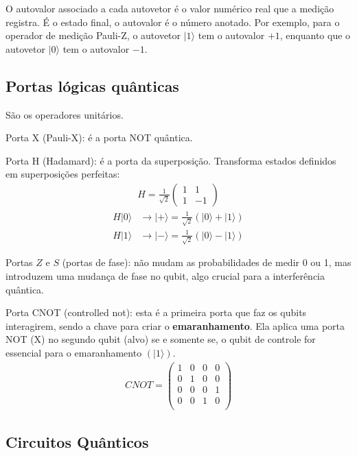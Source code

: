 \documentclass[12pt, a4paper]{article}
\newcommand{\ket}[1]{\lvert #1 \rangle}
\begin{document}
O autovalor associado a cada autovetor é o valor numérico real que a medição registra. É o estado final, o autovalor é o número anotado. Por exemplo, para o operador de medição Pauli-Z, o autovetor $\ket{1}$ tem o autovalor $+1$, enquanto que o autovetor $\ket{0}$ tem o autovalor $-1$. 

\subsection{Portas lógicas quânticas}
São os operadores unitários. 

Porta X (Pauli-X): é a porta NOT quântica.

Porta H (Hadamard): é a porta da superposição. Transforma estados definidos em superposições perfeitas:
\begin{align}
    H = \frac{1}{\sqrt{2}}\begin{pmatrix}
        1 & 1 \\
        1 & -1
    \end{pmatrix}    
\end{align} 
\begin{align}
    H\ket{0} &\longrightarrow \ket{+} = \frac{1}{\sqrt{2}}(\ket{0} + \ket{1}) \\ 
    H\ket{1} &\longrightarrow \ket{-} = \frac{1}{\sqrt{2}}(\ket{0} - \ket{1})
\end{align}

Portas $Z$ e $S$ (portas de fase): não mudam as probabilidades de medir 0 ou 1, mas introduzem uma mudança de fase no qubit, algo crucial para a interferência quântica.

Porta CNOT (controlled not): esta é a primeira porta que faz os qubits interagirem, sendo a chave para criar o \textbf{emaranhamento}. Ela aplica uma porta NOT (X) no segundo qubit (alvo) se e somente se, o qubit de controle for essencial para o emaranhamento $(\ket{1})$. 
\begin{align}
    CNOT = \begin{pmatrix}
        1 & 0 & 0 & 0 \\
        0 & 1 & 0 & 0 \\
        0 & 0 & 0 & 1 \\
        0 & 0 & 1 & 0 \\
    \end{pmatrix}
\end{align}

\subsection{Circuitos Quânticos}
\end{document}
